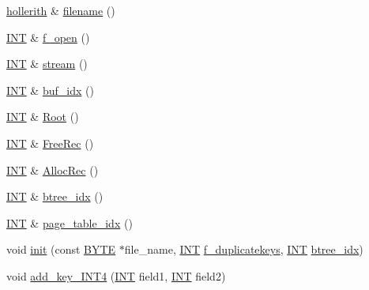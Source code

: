 \begin{DoxyCompactItemize}
\mbox{\hyperlink{classhollerith}{hollerith}} \& \mbox{\hyperlink{classbtree_ac15638387eb5a165403b8f73d584fe5a}{filename}} ()
\item 
\mbox{\hyperlink{galois_8h_a09fddde158a3a20bd2dcadb609de11dc}{I\+NT}} \& \mbox{\hyperlink{classbtree_a192d74607f02ea8e0ad631d6e6fd6704}{f\+\_\+open}} ()
\item 
\mbox{\hyperlink{galois_8h_a09fddde158a3a20bd2dcadb609de11dc}{I\+NT}} \& \mbox{\hyperlink{classbtree_af99e68df8c3674b7d77ed80a8bbcffac}{stream}} ()
\item 
\mbox{\hyperlink{galois_8h_a09fddde158a3a20bd2dcadb609de11dc}{I\+NT}} \& \mbox{\hyperlink{classbtree_a6a928fc93c93d8b5a83ad1ba699b453e}{buf\+\_\+idx}} ()
\item 
\mbox{\hyperlink{galois_8h_a09fddde158a3a20bd2dcadb609de11dc}{I\+NT}} \& \mbox{\hyperlink{classbtree_a2fd65be715ab94bf4a764c4f582a642b}{Root}} ()
\item 
\mbox{\hyperlink{galois_8h_a09fddde158a3a20bd2dcadb609de11dc}{I\+NT}} \& \mbox{\hyperlink{classbtree_a2ca35526158f016e569c53c411b5fb50}{Free\+Rec}} ()
\item 
\mbox{\hyperlink{galois_8h_a09fddde158a3a20bd2dcadb609de11dc}{I\+NT}} \& \mbox{\hyperlink{classbtree_adfd0217cbd0386bed9231810d581044b}{Alloc\+Rec}} ()
\item 
\mbox{\hyperlink{galois_8h_a09fddde158a3a20bd2dcadb609de11dc}{I\+NT}} \& \mbox{\hyperlink{classbtree_a716a53d4afaa38334205cad81be5546d}{btree\+\_\+idx}} ()
\item 
\mbox{\hyperlink{galois_8h_a09fddde158a3a20bd2dcadb609de11dc}{I\+NT}} \& \mbox{\hyperlink{classbtree_abc6a6f309e4c61cb5a7f4c4a248d384d}{page\+\_\+table\+\_\+idx}} ()
\item 
void \mbox{\hyperlink{classbtree_a3c88706e9886f1f9bc142b511aeab642}{init}} (const \mbox{\hyperlink{galois_8h_ab6cc7b4aeb6ea31aba2b3fbfc83ff5e6}{B\+Y\+TE}} $\ast$file\+\_\+name, \mbox{\hyperlink{galois_8h_a09fddde158a3a20bd2dcadb609de11dc}{I\+NT}} \mbox{\hyperlink{classbtree_aa53430cc1a527debec6fe02f1c8a2bf5}{f\+\_\+duplicatekeys}}, \mbox{\hyperlink{galois_8h_a09fddde158a3a20bd2dcadb609de11dc}{I\+NT}} \mbox{\hyperlink{classbtree_a716a53d4afaa38334205cad81be5546d}{btree\+\_\+idx}})
\item 
void \mbox{\hyperlink{classbtree_a4c42710e5f8cb4e3991d591fe2ae6f42}{add\+\_\+key\+\_\+\+I\+N\+T4}} (\mbox{\hyperlink{galois_8h_a09fddde158a3a20bd2dcadb609de11dc}{I\+NT}} field1, \mbox{\hyperlink{galois_8h_a09fddde158a3a20bd2dcadb609de11dc}{I\+NT}} field2)
\item 

\end{DoxyCompactItemize}
